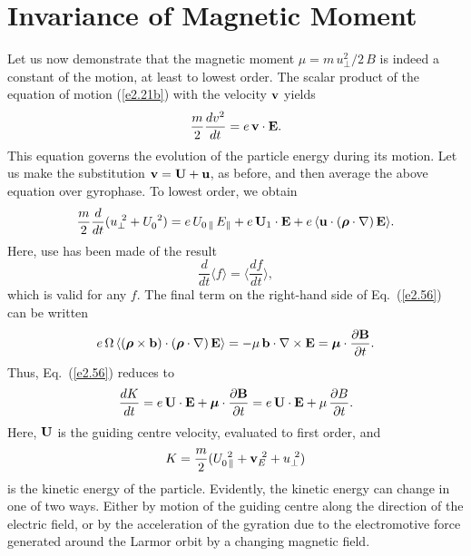 \section{Invariance of  Magnetic Moment}
Let us now demonstrate that the magnetic moment $\mu=m\, u_\perp^2 / 2\,B$
is indeed a constant of the motion, at least to lowest order. The scalar
product of the equation of motion (\ref{e2.21b}) with the velocity ${\bf v}$ yields
\begin{equation}
\frac{m}{2} \frac{d v^2}{dt} = e\,{\bf v}\cdot{\bf E}.
\end{equation}
This equation governs the evolution of the  particle energy during its
motion. Let us make the substitution ${\bf v}  = {\bf U} + {\bf u}$,
as before, and then average the above equation over gyrophase. To lowest order, we obtain
\begin{equation}\label{e2.56}
\frac{m}{2} \frac{d}{dt} (u_\perp^{~2} + U_0^{~2}) = e\,U_{0\,\parallel}
\,E_\parallel + e\, {\bf U}_1\cdot {\bf E} + e\,\langle
{\bf u}\cdot (\mbox{\boldmath$\rho$}\cdot\nabla)\,{\bf E}\rangle.
\end{equation}
Here, use has been made of the result
\begin{equation}
\frac{d}{dt} \langle f\rangle = \langle \frac{df}{dt}\rangle,
\end{equation}
which is valid for any $f$. The final term on the right-hand side of
Eq.~(\ref{e2.56}) can be written
\begin{equation}
e\,{\Omega} \,\langle (\mbox{\boldmath$\rho$}\times{\bf b})\cdot (\mbox{\boldmath$\rho$}\cdot\nabla)
\,{\bf E}\rangle = - \mu\,{\bf b}\cdot\nabla\times{\bf E} = \mbox{\boldmath$\mu$}\cdot
\frac{\partial {\bf B}}{\partial t}.
\end{equation}
Thus, Eq.~(\ref{e2.56}) reduces to
\begin{equation}\label{e2.59}
\frac{d K}{dt} = e\,{\bf U}\cdot{\bf E} + \mbox{\boldmath$\mu$}\cdot
\frac{\partial {\bf B}}{\partial t} = e\,{\bf U}\cdot{\bf E} + \mu\,
\frac{\partial B}{\partial t}.
\end{equation}
Here, ${\bf U}$ is the guiding centre velocity, evaluated to first order, and
\begin{equation}
K = \frac{m}{2} (U_{0\,\parallel}^{~2} + {\bf v}_E^{~2} + u_\perp^{~2})
\end{equation}
is the kinetic energy of the particle. Evidently, the kinetic energy can
change in one of two ways. Either by motion of the guiding centre along the
direction of the electric field, or by the acceleration of the gyration due
to the electromotive force generated around the Larmor orbit by a
changing magnetic field. 

